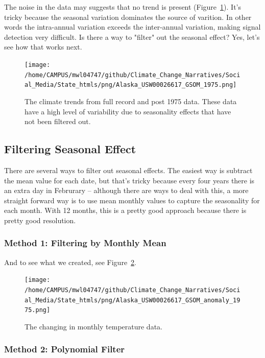 \documentclass{article}\usepackage[]{graphicx}\usepackage[]{color}
\begin{document}
The noise in the data may suggests that no trend is present (Figure~\ref{fig:GSOM-1975trend}). It's tricky because the seasonal variation dominates the source of varition. In other words the intra-annual variation exceeds the inter-annual variation, making signal detection very difficult. Is there a way to "filter" out the seasonal effect? Yes, let's see how that works next. 

\begin{figure}
\texttt{[image: /home/CAMPUS/mwl04747/github/Climate\_Change\_Narratives/Social\_Media/State\_htmls/png/Alaska\_USW00026617\_GSOM\_1975.png]}
\caption{The climate trends from full record and post 1975 data. These data have a high level of variability due to seasonality effects that have not been filtered out.}
\label{fig:GSOM-1975trend}
\end{figure}


\subsection{Filtering Seasonal Effect}

There are several ways to filter out seasonal effects. The easiest way is subtract the mean value for each date, but that's tricky because every four years there is an extra day in Februrary -- although there are ways to deal with this, a more straight forward way is to use mean monthly values to capture the seasonality for each month. With 12 months, this is a pretty good approach because there is pretty good resolution. 

\subsubsection{Method 1: Filtering by Monthly Mean} 





And to see what we created, see Figure~\ref{fig:GSOM-anomaly}.

\begin{figure}
\texttt{[image: /home/CAMPUS/mwl04747/github/Climate\_Change\_Narratives/Social\_Media/State\_htmls/png/Alaska\_USW00026617\_GSOM\_anomaly\_1975.png]}
\caption{The changing in monthly temperature data.}
\label{fig:GSOM-anomaly}
\end{figure}

\subsubsection{Method 2: Polynomial Filter}
\end{document}
